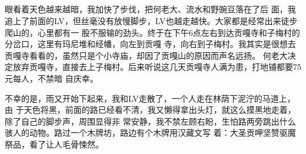 ﻿\documentclass[hyperref={bookmarks=ture}xcolor=pdflatex,svgnames,table,compress]{beamer}
\begin{document}
\subsection{}
\begin{frame}
\end{frame}

\subsection{}
\begin{frame}
\end{frame}

\subsection{}
\begin{frame}
\end{frame}

\subsection{}
\begin{frame}
  \begin{ztebox} {\footnotesize 眼看着天色越来越暗，我加快了步伐，把何老大、流水和野豌豆落在了后
      面，我追上了前面的LV，但丝毫没有放慢脚步，LV也越走越快。大家都是经常出来徒步爬山的，心里都有一
      股不服输的劲头。终于在下午6点左右到达贡嘎寺和子梅村的分岔口，这里有玛尼堆和经幡，向左到贡嘎
      寺，向右到子梅村。我其实是很想去贡嘎寺看看的，虽然只是个小寺庙，却因了贡嘎山的原因而声名远扬。
      何老大决定放弃贡嘎寺，直接去上子梅村。后来听说这几天贡嘎寺人满为患，打地铺都要75元每人，不禁暗
      自庆幸。}
\end{ztebox}
\begin{ztebox} {\footnotesize 不幸的是，雨又开始下起来，我和LV走散了，一个人走在林荫下泥泞的马道上，由
    于天色将黑，前面的路已经看不清，我又懒得拿出头灯，就这么摸黑地走着，除了自己的脚步声，周围显得非
    常安静，我不禁左顾右盼，生怕路两旁跳出什么骇人的动物。路过一个木牌坊，路边有个木牌用汉藏文写
    着：大圣贡呷坚赞驱魔祭品，看了让人毛骨悚然。}
\end{ztebox}
\end{frame}
\end{document}
